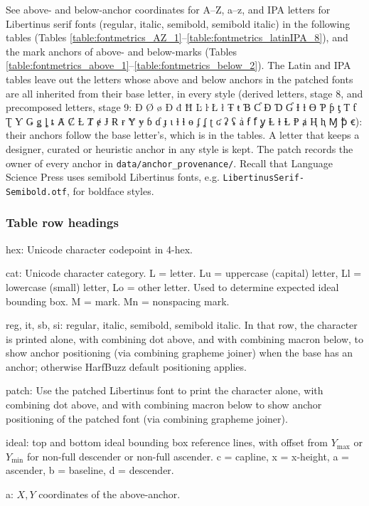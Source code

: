 \documentclass[landscape]{article}
\begin{document}
See above- and below-anchor coordinates for A--Z, a--z, and IPA letters for Libertinus serif fonts 
(regular, italic, semibold, semibold italic) in the following tables 
(Tables \ref{table:fontmetrics_AZ_1}--\ref{table:fontmetrics_latinIPA_8}), 
and the mark anchors of above- and below-marks 
(Tables \ref{table:fontmetrics_above_1}--\ref{table:fontmetrics_below_2}).
The Latin and IPA tables leave out the letters whose above and below anchors in the patched fonts are all inherited from their base letter, in every style
(derived letters, stage 8, and precomposed letters, stage 9: Ð Ø ø Đ đ Ħ Ŀ ŀ Ł ł Ŧ ŧ Ɓ Ƈ Ɖ Ɗ Ɠ Ɨ ƚ Ɵ Ƥ ƥ ƫ Ƭ ƭ Ʈ Ƴ Ǥ ǥ ȴ ȶ Ⱥ Ȼ Ƚ Ⱦ ɇ Ɉ Ɍ ɍ Ɏ ɏ ɓ ɗ ɟ ɩ ɫ ɬ ɵ ʄ ʆ ʈ ʛ ʡ ʢ ẚ ẜ ẝ ỿ Ⱡ ⱡ Ɫ Ᵽ ⱥ Ⱨ ⱨ Ɱ ꝥ ꞓ):
their anchors follow the base letter's, which is in the tables.
A letter that keeps a designer, curated or heuristic anchor in any style is kept.
The patch records the owner of every anchor in \verb|data/anchor_provenance/|.
Recall that Language Science Press uses semibold Libertinus fonts, e.g. 
\verb|LibertinusSerif-Semibold.otf|, for boldface styles.

\subsubsection*{Table row headings}

hex: Unicode character codepoint in 4-hex.

cat: Unicode character category. 
L = letter. Lu = uppercase (capital) letter, Ll = lowercase (small) letter,
Lo = other letter.
Used to determine expected ideal bounding box.
M = mark. Mn = nonspacing mark.

reg, it, sb, si: regular, italic, semibold, semibold italic. 
In that row, the character is printed alone, with combining dot above, and with combining macron below, 
to show anchor positioning (via combining grapheme joiner) when the base has an anchor; 
otherwise HarfBuzz default positioning applies.

patch: Use the patched Libertinus font to print the character alone, with combining dot above, and with combining macron below 
to show anchor positioning of the patched font (via combining grapheme joiner).

ideal: top and bottom ideal bounding box reference lines, 
with offset from $Y_\mathrm{max}$ or $Y_\mathrm{min}$ for non-full descender or non-full ascender.
c = capline, x = x-height, a = ascender, b = baseline, d = descender.

a: $X, Y$ coordinates of the above-anchor.
\end{document}
